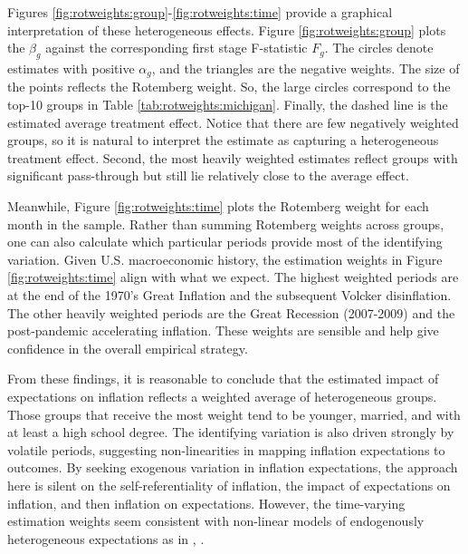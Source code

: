 \documentclass[12pt]{article}
\begin{document}
Figures \ref{fig:rotweights:group}-\ref{fig:rotweights:time} provide a graphical interpretation of these heterogeneous effects. Figure \ref{fig:rotweights:group} plots the $\beta_g$ against the corresponding first stage F-statistic $F_g$. The circles denote estimates with positive $\alpha_g$, and the triangles are the negative weights. The size of the points reflects the Rotemberg weight. So, the large circles correspond to the top-10 groups in Table \ref{tab:rotweights:michigan}. Finally, the dashed line is the estimated average treatment effect. Notice that there are few negatively weighted groups, so it is natural to interpret the estimate as capturing a heterogeneous treatment effect. Second, the most heavily weighted estimates reflect groups with significant pass-through but still lie relatively close to the average effect.  

Meanwhile, Figure \ref{fig:rotweights:time} plots the Rotemberg weight for each month in the sample. Rather than summing Rotemberg weights across groups, one can also calculate which particular periods provide most of the identifying variation. Given U.S. macroeconomic history, the estimation weights in Figure \ref{fig:rotweights:time} align with what we expect. The highest weighted periods are at the end of the 1970's Great Inflation and the subsequent Volcker disinflation. The other heavily weighted periods are the Great Recession (2007-2009) and the post-pandemic accelerating inflation. These weights are sensible and help give confidence in the overall empirical strategy.

From these findings, it is reasonable to conclude that the estimated impact of expectations on inflation reflects a weighted average of heterogeneous groups. Those groups that receive the most weight tend to be younger, married, and with at least a high school degree. The identifying variation is also driven strongly by volatile periods, suggesting non-linearities in mapping inflation expectations to outcomes. By seeking exogenous variation in inflation expectations, the approach here is silent on the self-referentiality of inflation, the impact of expectations on inflation, and then inflation on expectations. However, the time-varying estimation weights seem consistent with non-linear models of endogenously heterogeneous expectations as in \cite{BranchEJ2004}, \cite{BrockHommesEconometrica1997}.



\end{document}
